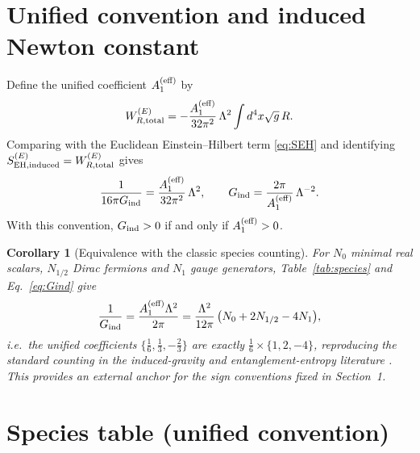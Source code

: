 \documentclass[11pt]{article}
\newtheorem{corollary}{Corollary}
\begin{document}
\section{Unified convention and induced Newton constant}
\label{sec:unified}
Define the unified coefficient $A_1^{\rm (eff)}$ by
\begin{equation}
W^{(E)}_{R,\rm total} = -\frac{A_1^{\rm (eff)}}{32\pi^2}\,\Lambda^2
\int d^4x \sqrt{g}\, R.
\label{eq:unified}
\end{equation}
Comparing with the Euclidean Einstein--Hilbert term \eqref{eq:SEH} and
identifying $S^{(E)}_{\rm EH,induced} = W^{(E)}_{R,\rm total}$ gives
\begin{equation}
\frac{1}{16\pi G_{\rm ind}} = \frac{A_1^{\rm (eff)}}{32\pi^2}\,\Lambda^2,
\qquad
G_{\rm ind} = \frac{2\pi}{A_1^{\rm (eff)}}\,\Lambda^{-2}.
\label{eq:Gind}
\end{equation}
With this convention, $G_{\rm ind} > 0$ if and only if $A_1^{\rm (eff)} > 0$.

\begin{corollary}[Equivalence with the classic species counting]
\label{cor:counting}
For $N_0$ minimal real scalars, $N_{1/2}$ Dirac fermions and $N_1$ gauge
generators, Table~\ref{tab:species} and Eq.~\eqref{eq:Gind} give
\begin{equation}
\frac{1}{G_{\rm ind}} = \frac{A_1^{\rm (eff)}\Lambda^2}{2\pi}
= \frac{\Lambda^2}{12\pi}\,\bigl( N_0 + 2N_{1/2} - 4N_1 \bigr),
\label{eq:counting}
\end{equation}
i.e.\ the unified coefficients $\{ \tfrac16, \tfrac13, -\tfrac23 \}$ are
exactly $\tfrac16 \times \{1, 2, -4\}$, reproducing the standard counting in
the induced-gravity and entanglement-entropy literature
\cite{Adler,Visser,Kabat}. This provides an external anchor for the sign
conventions fixed in Section~1.
\end{corollary}

\section{Species table (unified convention)}
\end{document}
